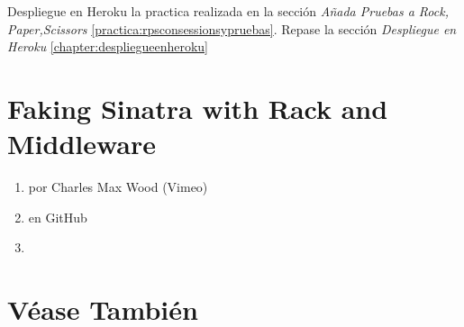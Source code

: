 Despliegue en Heroku la practica realizada en la sección
{\it Añada Pruebas a Rock, Paper,Scissors}
\ref{practica:rpsconsessionsypruebas}.
Repase la sección 
{\it Despliegue en Heroku}
\ref{chapter:despliegueenheroku}

\section{Faking Sinatra with Rack and Middleware}

\begin{enumerate}
\item
{} por
Charles Max Wood (Vimeo)
\item 
{} en GitHub
\item 
{}
\end{enumerate}



\section{Véase También}

